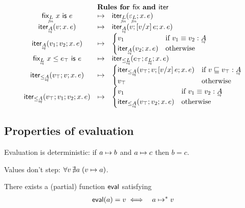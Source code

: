 \documentclass{article}
\begin{document}
\[\begin{array}{ccl}
  \vspace{0.5em}\\
  \multicolumn{3}{c}{\textbf{Rules for \ms{fix} and \ms{iter}}}\\
  \tfix{\fineq{L}}{x}{e} &\step& \iter{\fineq{L}}{\unit_{\fineq{L}}}{x}{e}\\
  \iter{\eq{A}}{v}{x}{e} &\step& \iterstep{\eq{A}}{v}{\sub{v/x} e}{x}{e}\\
  \iterstep{\eq{A}}{v_1}{v_2}{x}{e}
  &\step& \begin{cases}
    v_1 & \text{if}~{v_1 \aeq v_2 : \eq{A}}\\
    \iter{\eq{A}}{v_2}{x}{e} & \text{otherwise}
  \end{cases}\\
  \tfixle{\eq{L}}{x}{e_\top}{e} &\step& \iterle{\eq{L}}{e_\top}{\unit_{\eq{L}}}{x}{e}\\
  \iterle{\eq{A}}{v_\top}{v}{x}{e}
  &\step& \begin{cases}
    \iterlestep{\eq{A}}{v_\top}{v}{\sub{v/x} e}{x}{e} & \text{if}~{v \ale v_\top : \eq{A}}\\
    v_\top & \text{otherwise}
  \end{cases}\\
  \iterlestep{\eq{A}}{v_\top}{v_1}{v_2}{x}{e}
  &\step& \begin{cases}
    v_1 &\text{if}~{v_1 \aeq v_2 : \eq{A}}\\
    \iterle{\eq{A}}{v_\top}{v_2}{x}{e} & \text{otherwise}
  \end{cases}
\end{array}
\]

\subsection{Properties of evaluation}

\begin{theorem}\label{thm:determinism}
  Evaluation is deterministic: if $a \mapsto b$ and $a \mapsto c$ then $b = c$.
\end{theorem}

\begin{theorem}\label{thm:valuesdontstep}
  Values don't step: $\forall v\, \nexists a\; (v \mapsto a)$.
\end{theorem}

\newcommand{\evalfn}{\ms{eval}}
\begin{corollary}
  \label{cor:evalfn}
  There exists a (partial) function $\evalfn$ satisfying
  \begin{eqnarray*}
    \evalfn(a) = v &\iff& a \steps v
  \end{eqnarray*}
\end{corollary}
\end{document}
